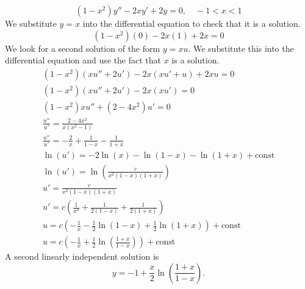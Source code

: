{%
\begin{Solution}
  \label{solution 1-x2y-2xy+2y}
  \[
  (1-x^2) y'' - 2 x y' + 2 y = 0, \quad -1 < x < 1
  \]
  We substitute $y = x$ into the differential equation to check that it is
  a solution.
  \[
  (1-x^2) (0) - 2 x (1) + 2 x = 0
  \]
  We look for a second solution of the form $y = x u$.  We substitute 
  this into the differential equation and use the fact that $x$ is a solution.
  \begin{gather*}
    (1-x^2) (x u'' + 2 u') - 2 x (x u' + u) + 2 x u = 0 \\
    (1-x^2) (x u'' + 2 u') - 2 x (x u') = 0 \\
    (1-x^2) x u'' + (2 - 4 x^2) u' = 0 \\
    \frac{u''}{u'} = \frac{2 - 4 x^2}{x(x^2 - 1)} \\
    \frac{u''}{u'} = - \frac{2}{x} + \frac{1}{1-x} - \frac{1}{1+x} \\
    \ln(u') = -2 \ln(x) - \ln(1-x) - \ln(1+x) + \mathrm{const} \\
    \ln(u') = \ln \left( \frac{c}{x^2 (1-x)(1+x)} \right) \\
    u' = \frac{c}{x^2 (1-x)(1+x)} \\
    u' = c \left( \frac{1}{x^2} + \frac{1}{2(1-x)} + \frac{1}{2(1+x)} \right) \\
    u = c \left( - \frac{1}{x} - \frac{1}{2} \ln(1-x) + \frac{1}{2} \ln(1+x) 
    \right) + \mathrm{const} \\
    u = c \left( - \frac{1}{x} + \frac{1}{2} \ln \left( \frac{1+x}{1-x} \right)
    \right)
    + \mathrm{const} 
  \end{gather*}
  A second linearly independent solution is
  \[
  \boxed{
    y = - 1 + \frac{x}{2} \ln \left( \frac{1+x}{1-x} \right).
    }
  \]
\end{Solution}







}
